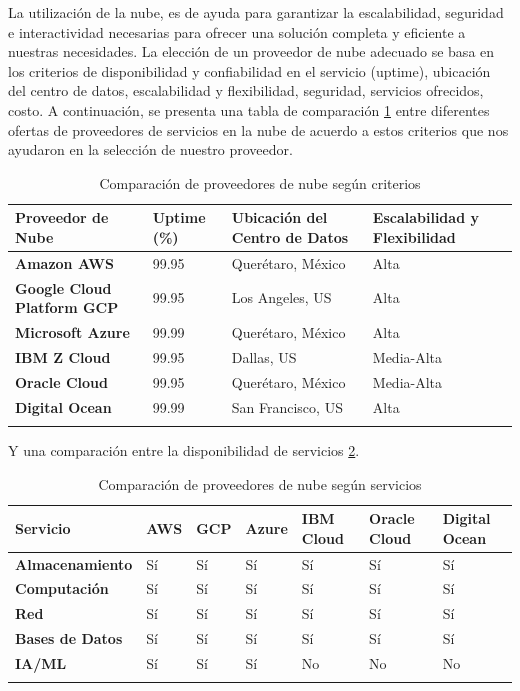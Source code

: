 La utilización de la nube, es de ayuda para garantizar la escalabilidad, seguridad e interactividad necesarias para ofrecer una solución completa y eficiente a nuestras necesidades. La elección de un proveedor de nube adecuado se basa en los criterios de disponibilidad y confiabilidad en el servicio (uptime), ubicación del centro de datos, escalabilidad y flexibilidad, seguridad, servicios ofrecidos, costo. A continuación, se presenta una tabla de comparación \ref{tab:comparacion_nube1} entre diferentes ofertas de proveedores de servicios en la nube de acuerdo a estos criterios que nos ayudaron en la selección de nuestro proveedor.
%
\begin{longtable}{|m{3cm}|m{3cm}|m{6cm}|m{3cm}|}
\hline
\textbf{Proveedor de Nube} & \textbf{Uptime (\%)} & \textbf{Ubicación del Centro de Datos} & \textbf{Escalabilidad y Flexibilidad} \\
\hline
\textbf{Amazon AWS} & 99.95 & Querétaro, México & Alta \\
\hline
\textbf{Google Cloud Platform GCP} & 99.95 & Los Angeles, US & Alta \\
\hline
\textbf{Microsoft Azure} & 99.99 & Querétaro, México & Alta \\
\hline
\textbf{IBM Z Cloud} & 99.95 & Dallas, US & Media-Alta \\
\hline
\textbf{Oracle Cloud} & 99.95 & Querétaro, México & Media-Alta \\
\hline
\textbf{Digital Ocean} & 99.99 & San Francisco, US & Alta \\
\hline
\caption{Comparación de proveedores de nube según criterios}
\label{tab:comparacion_nube1}
\end{longtable}
%
Y una comparación entre la disponibilidad de servicios \ref{tab:comparacion_nube2}.
%
\begin{longtable}{|m{3.5cm}|m{1.5cm}|m{1.5cm}|m{1.5cm}|m{1.5cm}|m{1.5cm}|m{1.5cm}|}
\hline
\textbf{Servicio} & \textbf{AWS} & \textbf{GCP} & \textbf{Azure} & \textbf{IBM Cloud} & \textbf{Oracle Cloud} & \textbf{Digital Ocean} \\
\hline
\textbf{Almacenamiento} & \cellcolor{green!25}Sí & \cellcolor{green!25}Sí & \cellcolor{green!25}Sí & \cellcolor{green!25}Sí & \cellcolor{green!25}Sí & \cellcolor{green!25}Sí \\
\hline
\textbf{Computación} & \cellcolor{green!25}Sí & \cellcolor{green!25}Sí & \cellcolor{green!25}Sí & \cellcolor{green!25}Sí & \cellcolor{green!25}Sí & \cellcolor{green!25}Sí \\
\hline
\textbf{Red} & \cellcolor{green!25}Sí & \cellcolor{green!25}Sí & \cellcolor{green!25}Sí & \cellcolor{green!25}Sí & \cellcolor{green!25}Sí & \cellcolor{green!25}Sí \\
\hline
\textbf{Bases de Datos} & \cellcolor{green!25}Sí & \cellcolor{green!25}Sí & \cellcolor{green!25}Sí & \cellcolor{green!25}Sí & \cellcolor{green!25}Sí & \cellcolor{green!25}Sí \\
\hline
\textbf{IA/ML} & \cellcolor{green!25}Sí & \cellcolor{green!25}Sí & \cellcolor{green!25}Sí & \cellcolor{red!25}No & \cellcolor{red!25}No & \cellcolor{red!25}No \\
\hline
\caption{Comparación de proveedores de nube según servicios}
\label{tab:comparacion_nube2}
\end{longtable}
